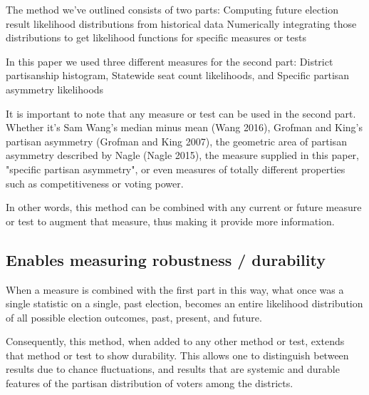 \documentclass[preprint,12pt]{article}
\begin{document}
The method we've outlined consists of two parts: 
Computing future election result likelihood distributions from historical data
Numerically integrating those distributions to get likelihood functions for specific measures or tests
 
In this paper we used three different measures for the second part:
District partisanship histogram,
Statewide seat count likelihoods, and 
Specific partisan asymmetry likelihoods
 
It is important to note that any measure or test can be used in the second part.  Whether it's Sam Wang's median minus mean (Wang 2016), Grofman and King's partisan asymmetry  (Grofman and King 2007), the geometric area of partisan asymmetry described by Nagle (Nagle 2015), the measure supplied in this paper, "specific partisan asymmetry", or even measures of totally different properties such as competitiveness or voting power.
 
In other words, this method can be combined with any current or future measure or test to augment that measure, thus making it provide more information.
 
\subsection{Enables measuring robustness / durability}
 
When a measure is combined with the first part in this way, what once was a single statistic on a single, past election, becomes an entire likelihood distribution of all possible election outcomes, past, present, and future.
 
Consequently, this method, when added to any other method or test, extends that method or test to show durability.  This allows one to distinguish between results due to chance fluctuations, and results that are systemic and durable features of the partisan distribution of voters among the districts.


\clearpage
\section*{}
%
%
\clearpage
\end{document}
